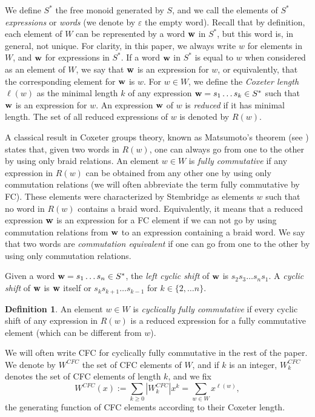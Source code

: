 \documentclass[reqno,12pt]{amsart}
\theoremstyle{definition}
\newtheorem{definition}[Theorem]{Definition}
\begin{document}
 We define $S^*$ the free monoid generated by $S$, and we call the elements of $S^*$ \emph{expressions} or \emph{words} (we denote by $\varepsilon$ the empty word). Recall that by definition, each element of $W$ can be represented by a word $\bf w$ in  $S^*$, but this word is, in general, not unique. For clarity, in this paper, we always write $w$ for elements in $W$, and $\bf w$ for expressions in $S^*$. If a word $\bf w$ in $S^*$ is equal to $w$ when considered as an element of $W$, we say that $\bf w$ is an expression for $w$, or equivalently, that the corresponding element for $\bf w$ is $w$.  For $w \in W$, we define the \emph{Coxeter length $\ell(w)$} as the minimal length $k$ of any expression ${\bf w}=s_1\ldots s_k \in S^*$ such that ${\bf w}$ is an expression for $w$. An expression $\bf w$ of $w$ is \emph{reduced} if it has minimal length. The set of all reduced expressions of $w$ is denoted by $R(w)$.

A classical result in Coxeter groups theory, known as Matsumoto's theorem (see \cite[Theorem 3.3.1]{BB}) states that, given two words in $R(w)$, one can always go from one to the other by using only braid relations. An element $w \in W$ is \emph{fully commutative} if any expression in $R(w)$ can be obtained from any other one by using only commutation relations (we will often abbreviate the term fully commutative by FC). These elements were characterized by Stembridge \cite[Proposition 2.1]{STEM1} as elements $w$ such that no word in $R(w)$ contains a braid word. Equivalently, it means that a reduced expression $\bf w$ is an expression for a FC element if we can not go by using commutation relations from $ \bf w$ to an expression containing a braid word. We say that two words are \emph{commutation equivalent} if one can go from one to the other by using only commutation relations. 

Given a word ${\bf w }= s_1 \ldots s_n \in S^*$, the \emph{left cyclic shift} of $\bf w$ is $s_2s_3\ldots s_ns_1$. A \emph{cyclic shift} of $\bf w$ is $\bf w$ itself or $s_ks_{k+1}\ldots s_{k-1}$ for $k \in \{2, \ldots n\}$.

\begin{definition}An element $w\in W$ is \emph{cyclically fully commutative}  if every cyclic shift of any expression in $R(w)$ is a reduced expression for a fully commutative element (which can be different from $w$). 

\end{definition}

We will often write CFC for cyclically fully commutative in the rest of the paper. We denote by $W^{CFC}$ the set of CFC elements of $W$, and if $k$ is an integer, $W^{CFC}_k$ denotes the set of CFC elements of length $k$, and we fix \begin{equation}W^{CFC}(x):=\sum_{k \geq 0} |W^{CFC}_k| x^k = \sum_{w \in W} x^{\ell(w)},
\end{equation} 
the generating function of CFC elements according to their Coxeter length.
\end{document}
